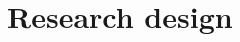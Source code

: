 \documentclass[12pt]{article}
\begin{document}
% 

\section{Research design} \label{Research design}
\end{document}
